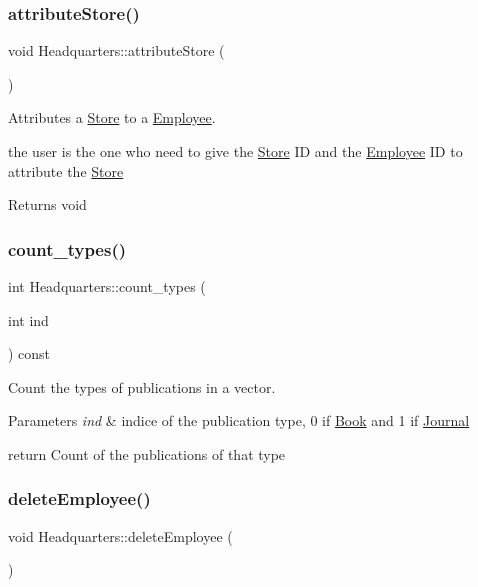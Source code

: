 \subsubsection{\texorpdfstring{attribute\+Store()}{attributeStore()}}
{\footnotesize\ttfamily void Headquarters\+::attribute\+Store (\begin{DoxyParamCaption}{ }\end{DoxyParamCaption})}



Attributes a \hyperlink{class_store}{Store} to a \hyperlink{class_employee}{Employee}. 

the user is the one who need to give the \hyperlink{class_store}{Store} ID and the \hyperlink{class_employee}{Employee} ID to attribute the \hyperlink{class_store}{Store}

\begin{DoxyReturn}{Returns}
void 
\end{DoxyReturn}
\mbox{\label{class_headquarters_a6951a0254016c43b0d54bd17195d711d}} 
\subsubsection{\texorpdfstring{count\+\_\+types()}{count\_types()}}
{\footnotesize\ttfamily int Headquarters\+::count\+\_\+types (\begin{DoxyParamCaption}\item[{int}]{ind }\end{DoxyParamCaption}) const}



Count the types of publications in a vector. 


\begin{DoxyParams}{Parameters}
{\em ind} & indice of the publication type, 0 if \hyperlink{class_book}{Book} and 1 if \hyperlink{class_journal}{Journal}\\
\hline
\end{DoxyParams}
return Count of the publications of that type \mbox{\label{class_headquarters_acf608a712eb8c756149f21ab1d6b38f5}} 
\subsubsection{\texorpdfstring{delete\+Employee()}{deleteEmployee()}}
{\footnotesize\ttfamily void Headquarters\+::delete\+Employee (\begin{DoxyParamCaption}{ }\end{DoxyParamCaption})}



